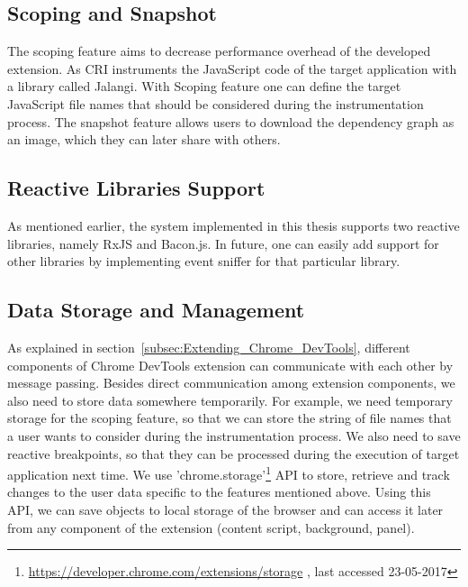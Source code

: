 \subsection{Scoping and Snapshot}
The scoping feature aims to decrease performance overhead of the developed extension. As CRI instruments the JavaScript code of the target application with a library called Jalangi. With Scoping feature one can define the target JavaScript file names that should be considered during the instrumentation process. The snapshot feature allows users to download the dependency graph as an image, which they can later share with others. 

\subsection{Reactive Libraries Support}
As mentioned earlier, the system implemented in this thesis supports two reactive libraries, namely RxJS and Bacon.js. In future, one can easily add support for other libraries by implementing event sniffer for that particular library. 

\subsection{Data Storage and Management} \label{subsec:Data_Storage_and_mgmt}
As explained in section~\ref{subsec:Extending_Chrome_DevTools}, different components of Chrome DevTools extension can communicate with each other by message passing. Besides direct communication among extension components, we also need to store data somewhere temporarily. For example, we need temporary storage for the scoping feature, so that we can store the string of file names that a user wants to consider during the instrumentation process. We also need to save reactive breakpoints, so that they can be processed during the execution of target application next time. We use 'chrome.storage'\footnote{\url{https://developer.chrome.com/extensions/storage} , last accessed 23-05-2017} API to store, retrieve and track changes to the user data specific to the features mentioned above. Using this API, we can save objects to local storage of the browser and can access it later from any component of the extension (content script, background, panel).

